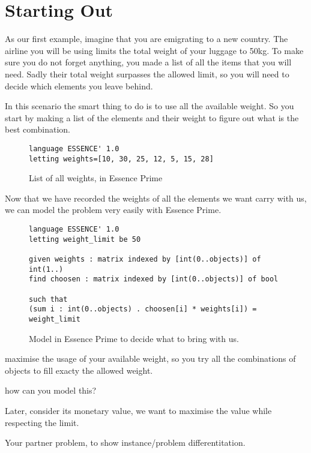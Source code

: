 \section{Starting Out}

As our first example, imagine that you are emigrating to a new country. The
airline you will be using limits the total weight of your luggage to 50kg.
To make sure you do not forget anything, you made a list of all the items that
you will need.  Sadly their total weight surpasses the allowed limit, so you
will need to decide which elements you leave behind.

In this scenario the smart thing to do is to use all the available weight. So you
start by making a list of the elements and their weight to figure out what is the
best combination.

\begin{figure}
\begin{lstlisting}
language ESSENCE' 1.0
letting weights=[10, 30, 25, 12, 5, 15, 28]
\end{lstlisting}
\caption{List of all weights, in Essence Prime}
\label{fig-knapsack1param}
\end{figure}

Now that we have recorded the weights of all the elements we want carry with us,
we can model the problem very easily with Essence Prime.

\begin{figure}
\begin{lstlisting}
language ESSENCE' 1.0
letting weight_limit be 50

given weights : matrix indexed by [int(0..objects)] of int(1..)
find choosen : matrix indexed by [int(0..objects)] of bool

such that
(sum i : int(0..objects) . choosen[i] * weights[i]) = weight_limit
\end{lstlisting}
\caption{Model in Essence Prime to decide what to bring with us.}
\label{fig-knapsack1}
\end{figure}

maximise the usage of your available weight, so
you try all the combinations of objects to fill exacty the allowed weight.

how can you model this?

Later, consider its monetary value, we want to maximise the value while respecting the
limit.

Your partner problem, to show instance/problem differentitation.

%
%
%
%
%


